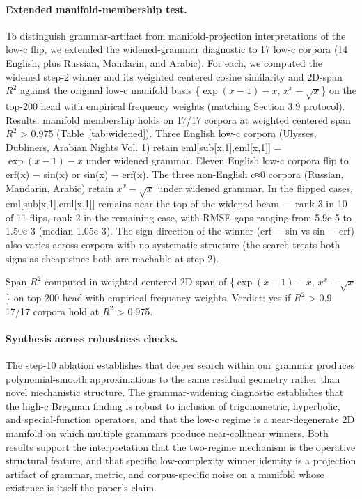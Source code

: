 \documentclass[11pt]{article}
\begin{document}
\paragraph{Extended manifold-membership test.} To distinguish grammar-artifact from manifold-projection interpretations of the low-c flip, we extended the widened-grammar diagnostic to 17 low-c corpora (14 English, plus Russian, Mandarin, and Arabic). For each, we computed the widened step-2 winner and its weighted centered cosine similarity and 2D-span $R^2$ against the original low-c manifold basis \{$\exp(x-1)-x$, $x^x-\sqrt{x}$\} on the top-200 head with empirical frequency weights (matching Section 3.9 protocol). Results: manifold membership holds on 17/17 corpora at weighted centered span $R^2$ > 0.975 (Table~\ref{tab:widened}). Three English low-c corpora (Ulysses, Dubliners, Arabian Nights Vol. 1) retain eml[sub[x,1],eml[x,1]] = $\exp(x-1)-x$ under widened grammar. Eleven English low-c corpora flip to erf(x) − sin(x) or sin(x) − erf(x). The three non-English c≈0 corpora (Russian, Mandarin, Arabic) retain $x^x-\sqrt{x}$ under widened grammar. In the flipped cases, eml[sub[x,1],eml[x,1]] remains near the top of the widened beam — rank 3 in 10 of 11 flips, rank 2 in the remaining case, with RMSE gaps ranging from 5.9e-5 to 1.50e-3 (median 1.05e-3). The sign direction of the winner (erf − sin vs sin − erf) also varies across corpora with no systematic structure (the search treats both signs as cheap since both are reachable at step 2).



Span $R^2$ computed in weighted centered 2D span of \{$\exp(x-1)-x$, $x^x-\sqrt{x}$\} on top-200 head with empirical frequency weights. Verdict: yes if $R^2$ > 0.9. 17/17 corpora hold at $R^2$ > 0.975.

\paragraph{Synthesis across robustness checks.} The step-10 ablation establishes that deeper search within our grammar produces polynomial-smooth approximations to the same residual geometry rather than novel mechanistic structure. The grammar-widening diagnostic establishes that the high-c Bregman finding is robust to inclusion of trigonometric, hyperbolic, and special-function operators, and that the low-c regime is a near-degenerate 2D manifold on which multiple grammars produce near-collinear winners. Both results support the interpretation that the two-regime mechanism is the operative structural feature, and that specific low-complexity winner identity is a projection artifact of grammar, metric, and corpus-specific noise on a manifold whose existence is itself the paper's claim.
\end{document}
